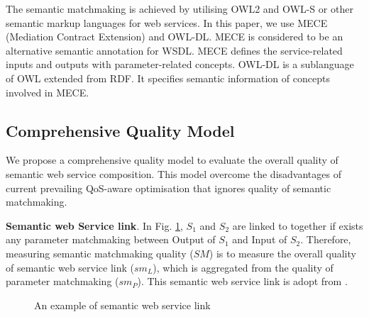 \documentclass{IEEEtran}
\begin{document}
The semantic matchmaking is achieved by utilising OWL2 and OWL-S or other semantic markup languages for web services. In this paper, we use MECE (Mediation Contract Extension) \cite{bleul2008self} and OWL-DL. MECE is considered to be an alternative semantic annotation for WSDL. MECE defines the service-related inputs and outputs with parameter-related concepts. OWL-DL is a sublanguage of OWL extended from RDF. It specifies semantic information of concepts involved in MECE.

\subsection{Comprehensive Quality Model}\label{qualityModel}
We propose a comprehensive quality model to evaluate the overall quality of semantic web service composition. This model overcome the disadvantages of current prevailing QoS-aware optimisation that ignores quality of semantic matchmaking.

\textbf{Semantic web Service link}. In Fig. \ref{semanticLink}, $S_{1}$ and $S_{2}$ are linked to together if exists any parameter matchmaking between  Output of $S_1$ and Input of $S_2$.  Therefore, measuring semantic matchmaking quality ($SM$) is to measure the overall quality of semantic web service link ($sm_{L}$), which is aggregated from the quality of parameter matchmaking ($sm_{P}$). This semantic web service link is adopt from \cite{lecue2009optimizing}.

\begin{figure}[h]
\centering
{}
 \caption{ An example of semantic web service link}
 \label{semanticLink}
\end{figure}
\end{document}
